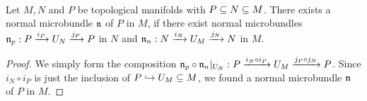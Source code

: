  \\
Let $M, N$ and $P$ be topological manifolds with $P \sub N \sub M$.
There exists a normal microbundle $\bn$ of $P$ in $M$, if
there exist normal microbundles $\bn_p: \bundle{P}{U_N}{i_P}{j_P}$ in $N$ and $\bn_n: \bundle{N}{U_M}{i_N}{j_N}$ in $M$.
\begin{proof}
We simply form the composition $\bn_p \circ \bn_n\restrict{U_N}: \bundle{P}{U_M}{i_N \circ i_P}{j_P \circ j_N}$.
Since $i_N \circ i_P$ is just the inclusion of $P \incl U_M \sub M$, we found a normal microbundle $\bn$ of $P$ in $M$.
\end{proof}